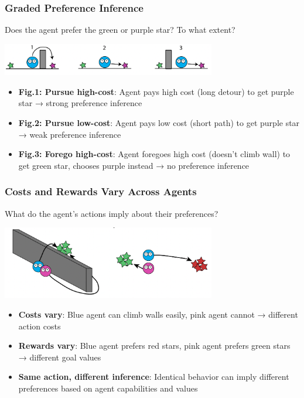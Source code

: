 \documentclass{beamer}
\begin{document}
\begin{frame}
\frametitle{Graded Preference Inference}
\begin{center}
Does the agent prefer the green or purple star? To what extent? 
\end{center}
\vspace{0.3cm}
\begin{center}
\includegraphics[width=0.7\textwidth]{utility3.png}
\end{center}

\vspace{0.3cm}
\begin{itemize}
    \pause
    \item \textbf{Fig.1: Pursue high-cost}: Agent pays high cost (long detour) to get purple star → strong preference inference
    \pause
    \item \textbf{Fig.2: Pursue low-cost}: Agent pays low cost (short path) to get purple star → weak preference inference
    \pause
    \item \textbf{Fig.3: Forego high-cost}: Agent foregoes high cost (doesn't climb wall) to get green star, chooses purple instead → no preference inference
\end{itemize}
\end{frame}

\begin{frame}
\frametitle{Costs and Rewards Vary Across Agents}
\begin{center}
What do the agent's actions imply about their preferences?
\end{center}
\vspace{0.3cm}
\begin{center}
\includegraphics[width=0.7\textwidth]{utility4.png}
\end{center}

\vspace{0.3cm}
\begin{itemize}
    \pause
    \item \textbf{Costs vary}: Blue agent can climb walls easily, pink agent cannot → different action costs
    \pause
    \item \textbf{Rewards vary}: Blue agent prefers red stars, pink agent prefers green stars → different goal values
    \pause
    \item \textbf{Same action, different inference}: Identical behavior can imply different preferences based on agent capabilities and values
\end{itemize}
\end{frame}
\end{document}
